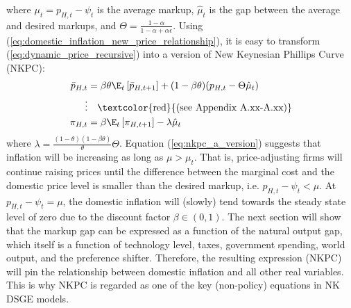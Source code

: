 where $\mu_t = p_{H,t} - \psi_t$ is the average markup, $\hat{\mu}_t$ is the gap between the average and desired markups, and $\Theta = \frac{1-\alpha}{1-\alpha + \alpha \epsilon}$. Using (\ref{eq:domestic_inflation_new_price_relationship}), it is easy to transform (\ref{eq:dynamic_price_recursive}) into a version of New Keynesian Phillips Curve (NKPC):
\begin{align}
    \bar{p}_{H,t} &= \beta \theta \E_t \left[ \bar{p}_{H,t+1} \right] + (1-\beta \theta)(p_{H,t} - \Theta \hat{\mu}_t) \\
    \vdots & \quad \text{\textcolor{red}{(see Appendix A.xx-A.xx)}} \nonumber \\
    \pi_{H,t} &= \beta \E_t \left[ \pi_{H,t+1}\right] - \lambda \hat{\mu}_t \label{eq:nkpc_a_version}
\end{align}
where $\lambda = \frac{(1-\theta)(1-\beta \theta)}{\theta}\Theta$. Equation (\ref{eq:nkpc_a_version}) suggests that inflation will be increasing as long as $\mu > \mu_t$. That is, price-adjusting firms will continue raising prices until the difference between the marginal cost and the domestic price level is smaller than the desired markup, i.e. $p_{H,t} - \psi_t < \mu$. At $p_{H,t} - \psi_t = \mu$, the domestic inflation will (slowly) tend towards the steady state level of zero due to the discount factor $\beta \in (0,1)$. The next section will show that the markup gap can be expressed as a function of the natural output gap, which itself is a function of technology level, taxes, government spending, world output, and the preference shifter. Therefore, the resulting expression (NKPC) will pin the relationship between domestic inflation and all other real variables. This is why NKPC is regarded as one of the key (non-policy) equations in NK DSGE models.